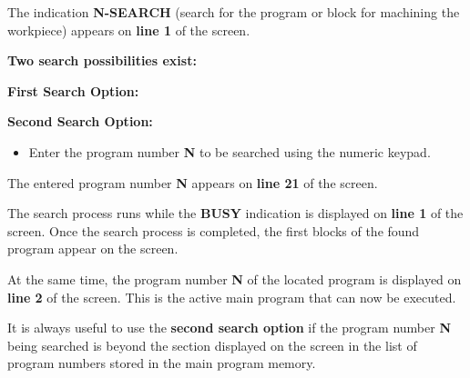 The indication \textbf{N-SEARCH} (search for the program or block for machining the workpiece) appears on \textbf{line 1} of the screen.

\textbf{Two search possibilities exist:}

\vspace{.5cm}

\textbf{First Search Option:}

\begin{itemize}
\end{itemize}

\begin{itemize}
\end{itemize}

\vspace{.5cm}

\textbf{Second Search Option:}

\begin{itemize}
    \item Enter the program number \textbf{N} to be searched using the numeric keypad.
\end{itemize}

\begin{itemize}
\end{itemize}

The entered program number \textbf{N} appears on \textbf{line 21} of the screen.

\begin{itemize}
\end{itemize}

\vspace{.5cm}

The search process runs while the \textbf{BUSY} indication is displayed on \textbf{line 1} of the screen.  
Once the search process is completed, the first blocks of the found program appear on the screen.

At the same time, the program number \textbf{N} of the located program is displayed on \textbf{line 2} of the screen.  
This is the active main program that can now be executed.

\notes

It is always useful to use the \textbf{second search option} if the program number \textbf{N} being searched is beyond the section displayed on the screen in the list of program numbers stored in the main program memory.
\newpage

